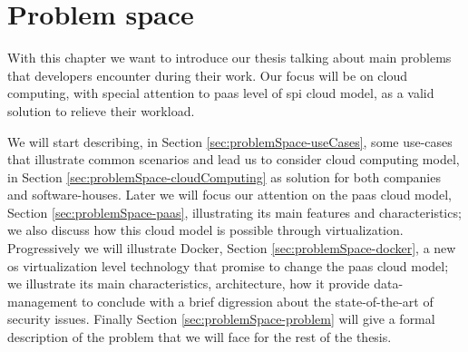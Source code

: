 %
%
\chapter{Problem space}
\label{cap:problemSpace}
With this chapter we want to introduce our thesis talking about main problems that developers
encounter during their work. Our focus will be on cloud computing, with special
attention to \ac{paas} level of \ac{spi} cloud model, as a valid solution to relieve their workload.

We will start describing, in Section \ref{sec:problemSpace-useCases}, some use-cases that illustrate
common scenarios and lead us to consider cloud computing model, in Section 
\ref{sec:problemSpace-cloudComputing} as solution for both companies and software-houses. Later we
will focus our attention on the \ac{paas} cloud model, Section \ref{sec:problemSpace-paas}, 
illustrating its main features and characteristics; we also discuss how this cloud model is possible
through virtualization. Progressively we will illustrate Docker, Section
\ref{sec:problemSpace-docker}, a new \acs{os} virtualization level technology that promise to change
the \ac{paas} cloud model; we illustrate its main characteristics, architecture, how it provide
data-management to conclude with a brief digression about the state-of-the-art of security
issues. Finally Section \ref{sec:problemSpace-problem} will give a formal description of the
problem that we will face for the rest of the thesis.













